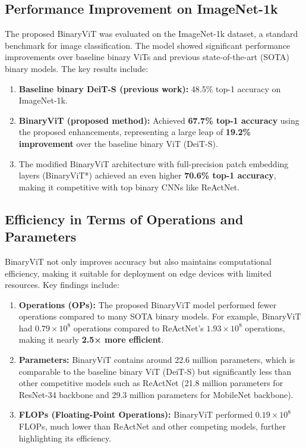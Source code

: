 \documentclass{report}
\begin{document}
	\subsection{Performance Improvement on ImageNet-1k}
	The proposed BinaryViT was evaluated on the ImageNet-1k dataset, a standard benchmark for image classification. The model showed significant performance improvements over baseline binary ViTs and previous state-of-the-art (SOTA) binary models. The key results include:
	\begin{enumerate}
		\item
		\textbf{Baseline binary DeiT-S (previous work):} 48.5\% top-1 accuracy on ImageNet-1k.
		
		
		\item 
		\textbf{BinaryViT (proposed method):} Achieved \textbf{67.7\% top-1 accuracy} using the proposed enhancements, representing a large leap of \textbf{19.2\% improvement} over the baseline binary ViT (DeiT-S).
		
		\item 
		The modified BinaryViT architecture with full-precision patch embedding layers (BinaryViT*) achieved an even higher \textbf{70.6\% top-1 accuracy}, making it competitive with top binary CNNs like ReActNet.
	\end{enumerate}
	
	\subsection{Efficiency in Terms of Operations and Parameters}
	BinaryViT not only improves accuracy but also maintains computational efficiency, making it suitable for deployment on edge devices with limited resources. Key findings include:
	
	\begin{enumerate}
		\item 
		\textbf{Operations (OPs):} The proposed BinaryViT model performed fewer operations compared to many SOTA binary models. For example, BinaryViT had $0.79 \times 10^8$ operations compared to ReActNet’s $1.93 \times 10^8$ operations, making it nearly \textbf{2.5× more efficient}.
		
		\item 
		\textbf{Parameters:} BinaryViT contains around 22.6 million parameters, which is comparable to the baseline binary ViT (DeiT-S) but significantly less than other competitive models such as ReActNet (21.8 million parameters for ResNet-34 backbone and 29.3 million parameters for MobileNet backbone).
		
		\item 
		\textbf{FLOPs (Floating-Point Operations):} BinaryViT performed $0.19 \times 10^8$ FLOPs, much lower than ReActNet and other competing models, further highlighting its efficiency.
	\end{enumerate}
	
\end{document}
